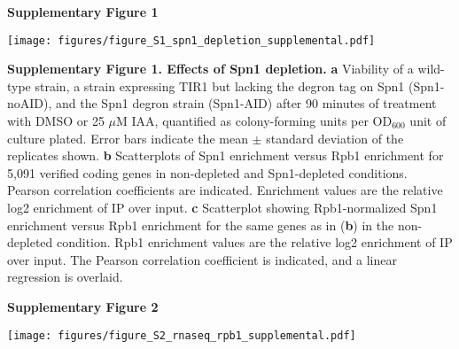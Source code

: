 \documentclass[8pt]{extarticle}
\begin{document}
\textbf{\large Supplementary Figure 1}

{\texttt{[image: figures/figure\_S1\_spn1\_depletion\_supplemental.pdf]}\par}

\vspace{2em}
\textbf{Supplementary Figure 1. Effects of Spn1 depletion.}
\textbf{a} Viability of a wild-type strain, a strain expressing TIR1 but lacking the degron tag on Spn1 (Spn1-noAID), and the Spn1 degron strain (Spn1-AID) after 90 minutes of treatment with DMSO or 25 $\mu$M IAA, quantified as colony-forming units per OD$_{600}$ unit of culture plated.
Error bars indicate the mean $\pm$ standard deviation of the replicates shown.
\textbf{b} Scatterplots of Spn1 enrichment versus Rpb1 enrichment for 5,091 verified coding genes in non-depleted and Spn1-depleted conditions.
Pearson correlation coefficients are indicated.
Enrichment values are the relative log2 enrichment of IP over input.
\textbf{c} Scatterplot showing Rpb1-normalized Spn1 enrichment versus Rpb1 enrichment for the same genes as in (\textbf{b}) in the non-depleted condition.
Rpb1 enrichment values are the relative log2 enrichment of IP over input.
The Pearson correlation coefficient is indicated, and a linear regression is overlaid.

\newpage

\textbf{\large Supplementary Figure 2}

{\texttt{[image: figures/figure\_S2\_rnaseq\_rpb1\_supplemental.pdf]}\par}
\end{document}
